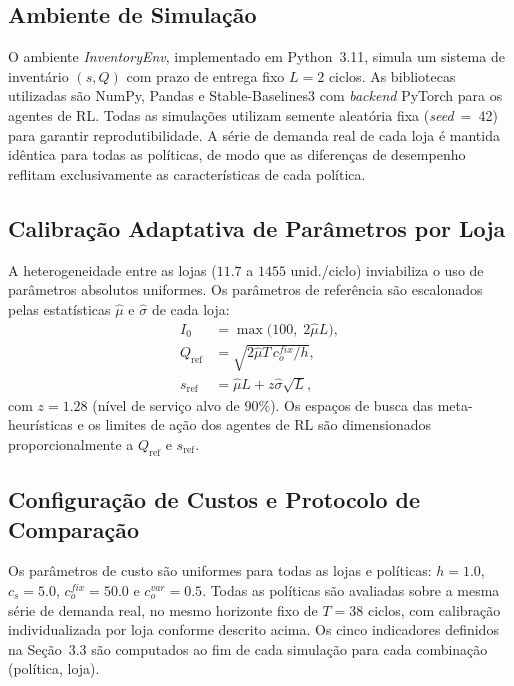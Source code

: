 \documentclass[a4paper,11pt]{article}
\begin{document}
\subsection{Ambiente de Simulação}

O ambiente \textit{InventoryEnv}, implementado em Python~3.11,
simula um sistema de inventário $(s, Q)$ com prazo de entrega fixo
$L = 2$ ciclos. As bibliotecas utilizadas são NumPy, Pandas e
Stable-Baselines3 com \textit{backend} PyTorch para os agentes de
RL. Todas as simulações utilizam semente aleatória fixa
(\textit{seed}~=~42) para garantir reprodutibilidade. A série de
demanda real de cada loja é mantida idêntica para todas as políticas,
de modo que as diferenças de desempenho reflitam exclusivamente as
características de cada política.

\subsection{Calibração Adaptativa de Parâmetros por Loja}

A heterogeneidade entre as lojas ($11.7$ a $1455$ unid./ciclo)
inviabiliza o uso de parâmetros absolutos uniformes. Os parâmetros
de referência são escalonados pelas estatísticas $\hat{\mu}$ e
$\hat{\sigma}$ de cada loja:
\begin{align}
  I_0 &= \max\!\bigl(100,\; 2\hat{\mu} L\bigr), \label{eq:I0}\\
  Q_\text{ref} &= \sqrt{2\hat{\mu} T\, c_o^{fix} / h}, \label{eq:qref}\\
  s_\text{ref} &= \hat{\mu} L + z\hat{\sigma}\sqrt{L}, \label{eq:sref}
\end{align}
com $z = 1.28$ (nível de serviço alvo de $90\%$). Os espaços de
busca das meta-heurísticas e os limites de ação dos agentes de RL
são dimensionados proporcionalmente a $Q_\text{ref}$ e $s_\text{ref}$.

\subsection{Configuração de Custos e Protocolo de Comparação}

Os parâmetros de custo são uniformes para todas as lojas e políticas:
$h = 1.0$, $c_s = 5.0$, $c_o^{fix} = 50.0$ e $c_o^{var} = 0.5$.
Todas as políticas são avaliadas sobre a mesma série de demanda
real, no mesmo horizonte fixo de $T = 38$ ciclos, com calibração
individualizada por loja conforme descrito acima. Os cinco
indicadores definidos na Seção~3.3 são computados ao fim de cada
simulação para cada combinação (política, loja).
\end{document}
